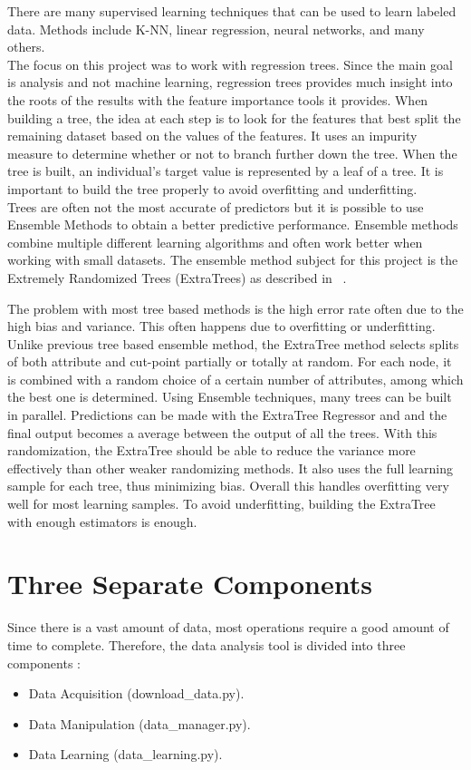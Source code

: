 \documentclass[a4paper,11pt]{report}
\numberwithin{figure}{section} %
\begin{document}
    There are many supervised learning techniques that can be used to learn labeled data.
    Methods include K-NN, linear regression, neural networks, and many others.\\

    The focus on this project was to work with regression trees.
    Since the main goal is analysis and not machine learning, regression trees provides much insight into the roots of the results with the feature importance tools it provides.
    When building a tree, the idea at each step is to look for the features that best split the remaining dataset based on the values of the features.
    It uses an impurity measure to determine whether or not to branch further down the tree.
    When the tree is built, an individual's target value is represented by a leaf of a tree.
    It is important to build the tree properly to avoid overfitting and underfitting.\\

    Trees are often not the most accurate of predictors but it is possible to use Ensemble Methods to obtain a better predictive performance.
    Ensemble methods combine multiple different learning algorithms and often work better when working with small datasets.
    The ensemble method subject for this project is the Extremely Randomized Trees (ExtraTrees) as described in ~\cite{extratree}.

    The problem with most tree based methods is the high error rate often due to the high bias and variance.
    This often happens due to overfitting or underfitting.
    Unlike previous tree based ensemble method, the ExtraTree method selects splits of both attribute and cut-point partially or totally at random.
    For each node, it is combined with a random choice of a certain number of attributes, among which the best one is determined.
    Using Ensemble techniques, many trees can be built in parallel.
    Predictions can be made with the ExtraTree Regressor and and the final output becomes a average between the output of all the trees.
    With this randomization, the ExtraTree should be able to reduce the variance more effectively than other weaker randomizing methods.
    It also uses the full learning sample for each tree, thus minimizing bias.
    Overall this handles overfitting very well for most learning samples.
    To avoid underfitting, building the ExtraTree with enough estimators is enough.

    \section{Three Separate Components}
    	Since there is a vast amount of data, most operations require a good amount of time to complete.
    	Therefore, the data analysis tool is divided into three components :
        \begin{itemize}
        \item[\textbullet] Data Acquisition (download\_data.py).
        \item[\textbullet] Data Manipulation (data\_manager.py).
        \item[\textbullet] Data Learning (data\_learning.py).
        \end{itemize}
\end{document}
